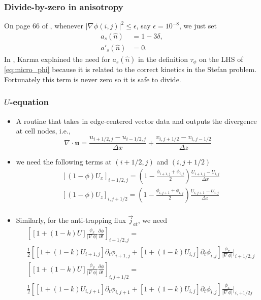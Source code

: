 \documentclass[a4paper,12pt]{article}
\newcommand{\B}[1]{\mathbf{#1}}
\renewcommand{\div}[1]{\nabla_{#1} \cdot}
\newcommand{\grad}[1]{\nabla_{#1}}
\begin{document}
\subsubsection{Divide-by-zero in anisotropy}
On page 66 of \cite{Provatas2010}, whenever $|\grad{}\phi(i,j)|^{2} \leq \epsilon $, say $\epsilon = 10^{-8}$, we just set
\begin{align*}
a_s(\hat{n}) &= 1-3\delta, \\
a'_s(\hat{n}) &= 0.
\end{align*}
In \cite{Karma1998}, Karma explained the need for $a_s(\hat{n})$ in the definition $\tau_{\phi}$ on the LHS of \cref{eq:micro_phi} because it is related to the correct kinetics in the Stefan problem. Fortunately this term is never zero so it is safe to divide. 


\subsubsection{$U$-equation}
\begin{itemize}
\item A routine that takes in edge-centered vector data and outputs the divergence at cell nodes, i.e.,
\begin{equation}
\div{} \B{u} = \frac{u_{i+1/2,j} - u_{i-1/2,j}}{\Delta x} +  \frac{v_{i, j+1/2} - v_{i,j-1/2}}{\Delta z}
\end{equation}

\item we need the following terms at $(i+1/2,j)$ and $(i,j+1/2)$
\begin{align}
& [(1-\phi) U_x]_{i+1/2,j} = \left( 1- \frac{\phi_{i+1,j} + \phi_{i,j}}{2} \right) \frac{U_{i+1,j}-U_{i,j}}{\Delta x}\\
& [(1-\phi) U_z]_{i,j+1/2} = \left( 1- \frac{\phi_{i,j+1} + \phi_{i,j}}{2} \right) \frac{U_{i,j+1}-U_{i,j}}{\Delta z}\\
\end{align}

\item Similarly, for the anti-trapping flux $\vec{j}_{at}$, we need
\begin{align}
& \left[ [1+(1-k)U]  \frac{\phi_x}{ |\grad{} \phi | } \frac{\partial \phi}{\partial t}  \right]_{i+1/2,j} = \nonumber \\
&  \frac{1}{2}\left[[1+(1-k)U_{i+1,j}]\partial_t\phi_{i+1,j}+[1+(1-k)U_{i,j}]\partial_t\phi_{i,j}\right]  \frac{\phi_x}{ |\grad{} \phi | }\bigg|_{i+1/2,j}  \\
& \left[ [1+(1-k)U]  \frac{\phi_y}{ |\grad{} \phi | } \frac{\partial \phi}{\partial t}  \right]_{i,j+1/2} = \nonumber \\ 
& \frac{1}{2}\left[[1+(1-k)U_{i,j+1}]\partial_t\phi_{i,j+1}+[1+(1-k)U_{i,j}]\partial_t\phi_{i,j}\right]  \frac{\phi_x}{ |\grad{} \phi | }\bigg|_{i,+1/2j}  
\end{align}
\end{itemize}
\end{document}
